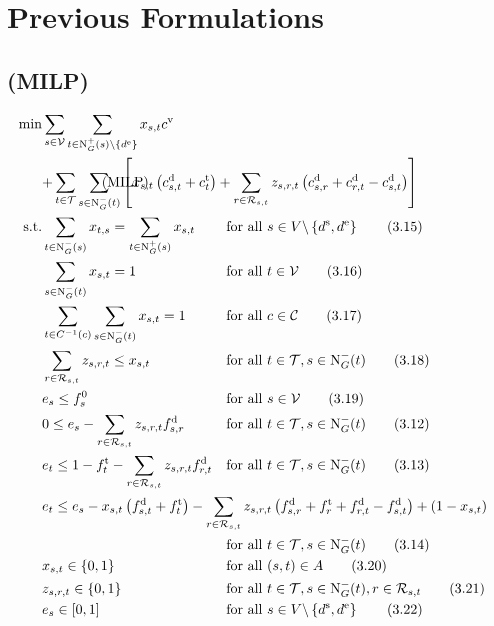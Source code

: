 \section*{Previous Formulations}

\subsection*{(MILP)}

\begin{align}
	\min & \sum_{s\in\mathcal{V}} \sum_{t\in\Nout(s)\backslash\{d^{\operatorname{e}}\}} x_{s,t}\cv \nonumber \\
	& \omit\rlap{$\displaystyle{ + \sum_{t\in\mathcal{T}} \sum_{s\in\Nin(t)} \left[x_{s,t}\left(\cd_{s,t}+\ct_{t}\right) + \sum_{r\in\Rst} z_{s,r,t}\left(\cd_{s,r}+\cd_{r,t}-\cd_{s,t}\right)\right]}$} \tag{MILP} \label{eq:Knoll:MILP} \\
	\text{s.t.} & \sum_{t\in\Nin(s)} x_{t,s} = \sum_{t\in\Nout(s)} x_{s,t} & & \text{for all } s\in V\backslash\left\{d^{\operatorname{s}},d^{\operatorname{e}}\right\} \tag{3.15} \\
	& \sum_{s\in\Nin(t)} x_{s,t} = 1 & & \text{for all } t\in\mathcal{V} \tag{3.16} \\
	& \sum_{t\in C^{-1}(c)} \sum_{s\in\Nin(t)} x_{s,t} = 1 & & \text{for all } c\in\mathcal{C} \tag{3.17} \label{eq:Knoll:costumer} \\
	& \sum_{r\in\Rst} z_{s,r,t} \leq x_{s,t} & & \text{for all } t\in\mathcal{T}, s\in\Nin(t) \tag{3.18} \\
	& e_s \leq f_s^0 & & \text{for all } s\in\mathcal{V} \tag{3.19} \\
	& 0 \leq e_s - \sum_{r\in\Rst} z_{s,r,t}\fd_{s,r} & & \text{for all } t\in\mathcal{T}, s\in\Nin(t) \tag{3.12} \\
	& e_t \leq 1 - \ft_t - \sum_{r\in\Rst} z_{s,r,t}\fd_{r,t} & & \text{for all } t\in\mathcal{T}, s\in\Nin(t) \tag{3.13} \\
	& \omit\rlap{$\displaystyle{e_t \leq e_s - x_{s,t}\left(f_{s,t}^{\operatorname{d}}+f_t^{\operatorname{t}}\right) - \sum_{r\in\Rst} z_{s,r,t}\left(\fd_{s,r}+\ft_r+\fd_{r,t}-\fd_{s,t}\right) + \left(1-x_{s,t}\right)}$} \nonumber \\
	& & & \text{for all } t\in\mathcal{T}, s\in\Nin(t) \tag{3.14} \\
	& x_{s,t}\in\{0,1\} & & \text{for all } (s,t)\in A \tag{3.20} \\
	& z_{s,r,t}\in\{0,1\} & & \text{for all } t\in\mathcal{T},s\in\Nin(t),r\in\Rst \tag{3.21} \\
	& e_s\in[0,1] & & \text{for all } s\in V\backslash\left\{d^{\operatorname{s}},d^{\operatorname{e}}\right\} \tag{3.22}
\end{align}

